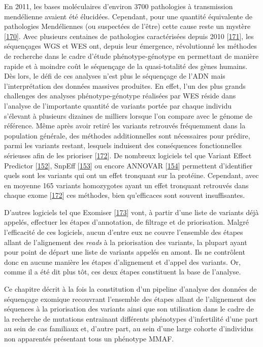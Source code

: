 \documentclass[12pt,a4paper,twoside]{ugathesis}
\theoremstyle{definition}
\theoremstyle{definition}
\theoremstyle{definition}
\theoremstyle{remark}
\begin{document}
En 2011, les bases moléculaires d'environ 3700 pathologies à
transmission mendélienne avaient été élucidées. Cependant, pour une
quantité équivalente de pathologies Mendéliennes (ou suspectées de
l'être) cette cause reste un mystère
{[}\protect\hyperlink{ref-Amberger2011}{170}{]}. Avec plusieurs
centaines de pathologies caractérisées depuis 2010
{[}\protect\hyperlink{ref-Ng}{171}{]}, les séquençages WGS et WES ont,
depuis leur émergence, révolutionné les méthodes de recherche dans le
cadre d'étude phénotype-génotype en permettant de manière rapide et à
moindre coût le séquençage de la quasi-totalité des gènes humains. Dès
lors, le défi de ces analyses n'est plus le séquençage de l'ADN mais
l'interprétation des données massives produites. En effet, l'un des plus
grands challenges des analyses phénotype-génotype réalisées par WES
réside dans l'analyse de l'importante quantité de variants portée par
chaque individu s'élevant à plusieurs dizaines de milliers lorsque l'on
compare avec le génome de référence. Même après avoir retiré les
variants retrouvés fréquemment dans la population générale, des méthodes
additionnelles sont nécessaires pour prédire, parmi les variants
restant, lesquels induisent des conséquences fonctionnelles sérieuses
afin de les prioriser {[}\protect\hyperlink{ref-Pelak2010}{172}{]}. De
nombreux logiciels tel que Variant Effect Predictor
{[}\protect\hyperlink{ref-McLaren2016}{152}{]}, SnpEff
{[}\protect\hyperlink{ref-Cingolani2012}{153}{]} ou encore ANNOVAR
{[}\protect\hyperlink{ref-Wang2010}{154}{]} permettent d'identifier
quels sont les variants qui ont un effet tronquant sur la protéine.
Cependant, avec en moyenne 165 variants homozygotes ayant un effet
tronquant retrouvés dans chaque exome
{[}\protect\hyperlink{ref-Pelak2010}{172}{]} ces méthodes, bien
qu'efficaces sont souvent insuffisantes.

D'autres logiciels tel que Exomiser
{[}\protect\hyperlink{ref-Robinson2014}{173}{]} vont, à partir d'une
liste de variants déjà appelés, effectuer les étapes d'annotation, de
filtrage et de priorisation. Malgré l'efficacité de ces logiciels, aucun
d'entre eux ne couvre l'ensemble des étapes allant de l'alignement des
\emph{reads} à la priorisation des variants, la plupart ayant pour point
de départ une liste de variants appelés en amont. Ils ne contrôlent donc
en aucune manière les étapes d'alignement et d'appel des variants. Or,
comme il a été dit plus tôt, ces deux étapes constituent la base de
l'analyse.

Ce chapitre décrit à la fois la constitution d'un pipeline d'analyse des
données de séquençage exomique recouvrant l'ensemble des étapes allant
de l'alignement des séquences à la priorisation des variants ainsi que
son utilisation dans le cadre de la recherche de mutations entrainant
différents phénotypes d'infertilité d'une part au sein de cas familiaux
et, d'autre part, au sein d'une large cohorte d'individus non apparentés
présentant tous un phénotype MMAF.
\end{document}

